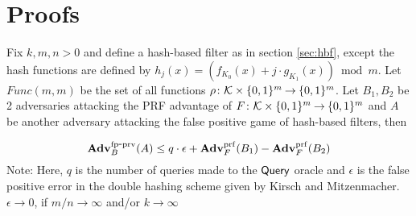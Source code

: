 \section{Proofs}
\begin{theorem}\label{thm}
Fix $k, m, n > 0$ and define a hash-based filter as in section \ref{sec:hbf}, except the hash functions are defined by $h_j(x) = \left( f_{K_0}(x) + j\cdot g_{K_1}(x)\right) \bmod m$. Let $Func(m,m)$ be the set of all functions $\rho \colon {\cal K} \times \{0,1\}^m {\:\stackrel{{\scriptscriptstyle \hspace{0.2em}}} {\rightarrow}\:} \{0,1\}^m$. Let $B_1, B_2$ be 2 adversaries attacking the PRF advantage of $F \colon {\cal K} \times \{0,1\}^m {\:\stackrel{{\scriptscriptstyle \hspace{0.2em}}} {\rightarrow}\:} \{0,1\}^m$ and $A$ be another adversary attacking the false positive game of hash-based filters, then 

\begin{equation}
\mathrm{\mathbf{Adv}}^{\mathrm{fp\mbox{-}prv}}_{B}(A) \leq  q \cdot \epsilon + \mathbf{Adv}^{\mathrm{prf}}_{F}(B_1) - \mathbf{Adv}^{\mathrm{prf}}_{F}(B_2)  
\end{equation}
Note: Here, $q$ is the number of queries made to the $\mathsf{Query}$ oracle and $\epsilon$ is the false positive error in the double hashing scheme given by Kirsch and Mitzenmacher. $\epsilon \rightarrow 0$, if $m/n \rightarrow \infty$ and/or $k \rightarrow \infty$ \cite{xxx}
\end{theorem}

